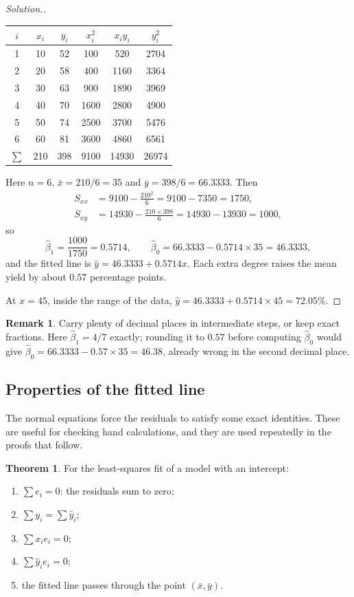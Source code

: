 \documentclass[11pt,a4paper]{article}
\numberwithin{equation}{section}
\theoremstyle{definition}
\newtheorem{thm}{Theorem}[subsection]
\newtheorem*{remark}{Remark}
\newenvironment{solution}
  {\renewcommand{\qedsymbol}{}\begin{proof}[\textit{Solution}.]}
  {\end{proof}}
\begin{document}
\begin{solution}
\begin{center}
\begin{tabular}{c|ccccc}
$i$ & $x_i$ & $y_i$ & $x_i^2$ & $x_i y_i$ & $y_i^2$ \\
\hline
1 & 10 & 52 & 100 & 520 & 2704 \\
2 & 20 & 58 & 400 & 1160 & 3364 \\
3 & 30 & 63 & 900 & 1890 & 3969 \\
4 & 40 & 70 & 1600 & 2800 & 4900 \\
5 & 50 & 74 & 2500 & 3700 & 5476 \\
6 & 60 & 81 & 3600 & 4860 & 6561 \\
\hline
$\sum$ & 210 & 398 & 9100 & 14930 & 26974 \\
\end{tabular}
\end{center}
Here $n = 6$, $\bar x = 210/6 = 35$ and $\bar y = 398/6 = 66.3333$. Then
\begin{align*}
S_{xx} &= 9100 - \frac{210^2}{6} = 9100 - 7350 = 1750, \\
S_{xy} &= 14930 - \frac{210 \times 398}{6} = 14930 - 13930 = 1000,
\end{align*}
so
\[
\hat\beta_1 = \frac{1000}{1750} = 0.5714, \qquad
\hat\beta_0 = 66.3333 - 0.5714 \times 35 = 46.3333 ,
\]
and the fitted line is $\hat y = 46.3333 + 0.5714x$. Each extra degree raises the mean
yield by about $0.57$ percentage points.

At $x = 45$, inside the range of the data,
$\hat y = 46.3333 + 0.5714 \times 45 = 72.05\%$.
\end{solution}

\begin{remark}
Carry plenty of decimal places in intermediate steps, or keep exact fractions. Here
$\hat\beta_1 = 4/7$ exactly; rounding it to $0.57$ before computing $\hat\beta_0$ would give
$\hat\beta_0 = 66.3333 - 0.57 \times 35 = 46.38$, already wrong in the second decimal place.
\end{remark}

\subsection{Properties of the fitted line}
The normal equations force the residuals to satisfy some exact identities. These are useful
for checking hand calculations, and they are used repeatedly in the proofs that follow.

\begin{thm}\label{thm:resid-props}
For the least-squares fit of a model with an intercept:
\begin{enumerate}[label=(\roman*)]
\item $\sum e_i = 0$: the residuals sum to zero;
\item $\sum y_i = \sum \hat y_i$;
\item $\sum x_i e_i = 0$;
\item $\sum \hat y_i e_i = 0$;
\item the fitted line passes through the point $(\bar x, \bar y)$.
\end{enumerate}
\end{thm}
\end{document}
